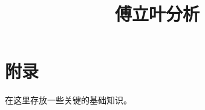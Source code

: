 \documentclass{book}
\begin{document}
\title{傅立叶分析}
\maketitle

\chapter{附录}
在这里存放一些关键的基础知识。


\cite{stein2003}


\end{document}
